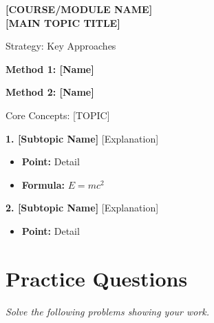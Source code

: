 \documentclass[12pt, a4paper]{article}
\newcommand{\headerBlock}[2]{
    \begin{tcolorbox}[
        enhanced, colback=MainColor, colframe=MainColor,
        arc=0mm, width=\textwidth, sharp corners,
        shadow={2mm}{-2mm}{0mm}{black!20}
    ]
        {\color{white}\small\sffamily\MakeUppercase{\textbf{#1}}} \vspace{0.2cm} \\
        {\color{white}\Huge\bfseries #2} \vspace{0.1cm}
    \end{tcolorbox}
    \vspace{0.5cm}
}
\begin{document}
\headerBlock
    {[COURSE/MODULE NAME]} 
    {[MAIN TOPIC TITLE]}               

\begin{strategybox}{Strategy: Key Approaches}
    \begin{multicols}{2}
        \textbf{Method 1: [Name]} \\
        [Explain when to use this method. Provide a small formula if needed.]
        
        \columnbreak
        
        \textbf{Method 2: [Name]} \\
        [Explain when to use this method. Provide a small formula if needed.]
    \end{multicols}
\end{strategybox}

\begin{theorybox}{Core Concepts: [TOPIC]}
    \begin{multicols}{2}
        \textbf{1. [Subtopic Name]}
        [Explanation]
        \begin{itemize}
            \item \textbf{Point:} Detail
            \item \textbf{Formula:} $ E = mc^2 $
        \end{itemize}
        
        \columnbreak
        
        \textbf{2. [Subtopic Name]}
        [Explanation]
        \begin{itemize}
            \item \textbf{Point:} Detail
        \end{itemize}
    \end{multicols}
\end{theorybox}

\section*{Practice Questions}
\noindent\textit{Solve the following problems showing your work.}

\end{document}

